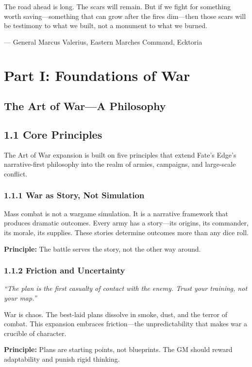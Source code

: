 \documentclass[11pt]{article}
\begin{document}
The road ahead is long. The scars will remain. But if we fight for something worth saving—something that can grow after the fires dim—then those scars will be testimony to what we built, not a monument to what we burned.

\noindent— General Marcus Valerius, Eastern Marches Command, Ecktoria


\section{Part I: Foundations of War}
\subsection{The Art of War—A Philosophy}

\subsection{1.1 Core Principles}

The Art of War expansion is built on five principles that extend Fate's Edge's narrative-first philosophy into the realm of armies, campaigns, and large-scale conflict.

\subsubsection{1.1.1 War as Story, Not Simulation}

Mass combat is not a wargame simulation. It is a narrative framework that produces dramatic outcomes. Every army has a story—its origins, its commander, its morale, its supplies. These stories determine outcomes more than any dice roll.

\textbf{Principle:} The battle serves the story, not the other way around.

\subsubsection{1.1.2 Friction and Uncertainty}

\textit{``The plan is the first casualty of contact with the enemy. Trust your training, not your map.''}

War is chaos. The best-laid plans dissolve in smoke, dust, and the terror of combat. This expansion embraces friction—the unpredictability that makes war a crucible of character.

\textbf{Principle:} Plans are starting points, not blueprints. The GM should reward adaptability and punish rigid thinking.
\end{document}
